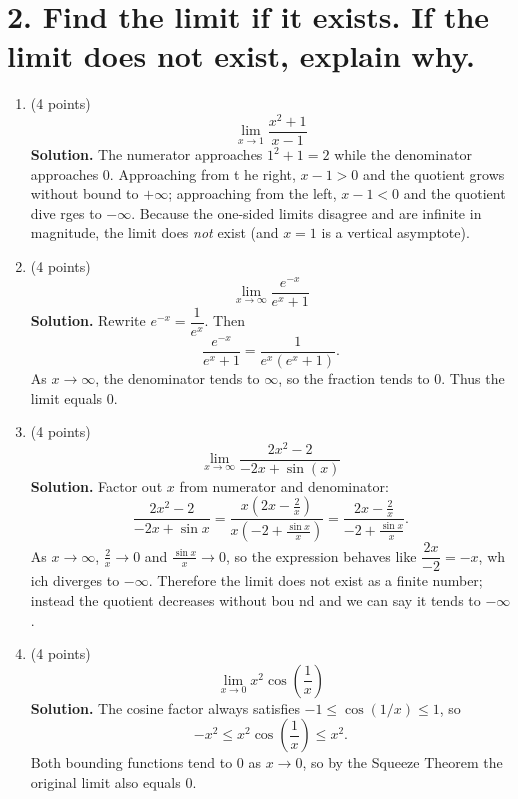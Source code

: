 \documentclass[12pt]{article}
\begin{document}
\newpage

\section*{2. Find the limit if it exists. If the limit does not exist, explain why.}

\begin{enumerate}[label=(\alph*)]
    \item (4 points)
    \[ \lim_{x\to 1} \frac{x^2+1}{x-1} \]
    {\color{blue}\textbf{Solution.} The numerator approaches $1^2+1=2$ while the denominator approaches $0$. Approaching from t
    he right, $x-1>0$ and the quotient grows without bound to $+\infty$; approaching from the left, $x-1<0$ and the quotient dive
    rges to $-\infty$. Because the one-sided limits disagree and are infinite in magnitude, the limit does \emph{not} exist (and
     $x=1$ is a vertical asymptote).}
    
    \item (4 points)
    \[ \lim_{x\to \infty} \frac{e^{-x}}{e^x+1} \]
    {\color{blue}\textbf{Solution.} Rewrite $e^{-x}=\dfrac{1}{e^x}$. Then
    \[
        \frac{e^{-x}}{e^x+1}=\frac{1}{e^x(e^x+1)}.
    \]
    As $x\to\infty$, the denominator tends to $\infty$, so the fraction tends to $0$. Thus the limit equals $\boxed{0}$.}
    
    \item (4 points)
    \[ \lim_{x\to \infty} \frac{2x^2-2}{-2x+\sin(x)} \]
    {\color{blue}\textbf{Solution.} Factor out $x$ from numerator and denominator:
    \[
        \frac{2x^2-2}{-2x+\sin x}=\frac{x\left(2x-\frac{2}{x}\right)}{x\left(-2+\frac{\sin x}{x}\right)}=\frac{2x-\frac{2}{x}}{-2+\frac{\sin x}{x}}.
    \]
    As $x\to\infty$, $\tfrac{2}{x}\to 0$ and $\tfrac{\sin x}{x}\to 0$, so the expression behaves like $\dfrac{2x}{-2}=-x$, wh
    ich diverges to $-\infty$. Therefore the limit does not exist as a finite number; instead the quotient decreases without bou
    nd and we can say it tends to $-\infty$.}
    
    \item (4 points)
    \[ \lim_{x\to 0} x^2 \cos\left(\frac{1}{x}\right) \]
    {\color{blue}\textbf{Solution.} The cosine factor always satisfies $-1\leq \cos(1/x)\leq 1$, so
    \[
        -x^2\leq x^2\cos\left(\frac{1}{x}\right)\leq x^2.
    \]
    Both bounding functions tend to $0$ as $x\to 0$, so by the Squeeze Theorem the original limit also equals $0$.}
    
\end{enumerate}
\end{document}
